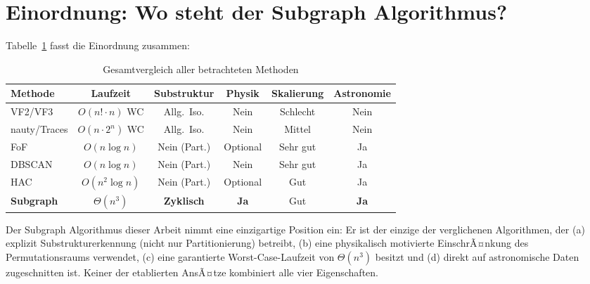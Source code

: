 ﻿\documentclass[a4paper,12pt]{report}
\theoremstyle{definition}
\begin{document}
\section{Einordnung: Wo steht der Subgraph Algorithmus?}
\label{sec:related_fazit}

Tabelle~\ref{tab:gesamtvergleich} fasst die Einordnung zusammen:

\begin{table}[H]
\centering
\caption{Gesamtvergleich aller betrachteten Methoden}
\label{tab:gesamtvergleich}
\begin{tabular}{lccccc}
\toprule
Methode & Laufzeit & Substruktur & Physik & Skalierung & Astronomie \\
\midrule
VF2/VF3             & $O(n! \cdot n)$ WC   & Allg.\ Iso. & Nein & Schlecht & Nein \\
nauty/Traces        & $O(n \cdot 2^n)$ WC  & Allg.\ Iso. & Nein & Mittel   & Nein \\
FoF                 & $O(n \log n)$        & Nein (Part.)& Optional & Sehr gut & Ja  \\
DBSCAN              & $O(n \log n)$        & Nein (Part.)& Nein & Sehr gut & Ja  \\
HAC                 & $O(n^2 \log n)$      & Nein (Part.)& Optional & Gut   & Ja  \\
\textbf{Subgraph} & $\Theta(n^3)$ & \textbf{Zyklisch} & \textbf{Ja} & Gut & \textbf{Ja} \\
\bottomrule
\end{tabular}
\end{table}

Der Subgraph Algorithmus dieser Arbeit nimmt eine einzigartige Position ein: Er ist der einzige der verglichenen Algorithmen, der (a) explizit Substrukturerkennung (nicht nur Partitionierung) betreibt, (b) eine physikalisch motivierte EinschrÃ¤nkung des Permutationsraums verwendet, (c) eine garantierte Worst-Case-Laufzeit von $\Theta(n^3)$ besitzt und (d) direkt auf astronomische Daten zugeschnitten ist. Keiner der etablierten AnsÃ¤tze kombiniert alle vier Eigenschaften.
\end{document}

